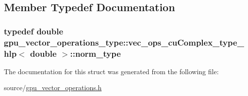 \subsection{Member Typedef Documentation}
\hypertarget{structgpu__vector__operations__type_1_1vec__ops__cuComplex__type__hlp_3_01double_01_4_add361fe5e712d2fc1e3bc5142c49b6d0}{
\subsubsection[{norm\-\_\-type}]{\setlength{\rightskip}{0pt plus 5cm}typedef double {\bf gpu\-\_\-vector\-\_\-operations\-\_\-type\-::vec\-\_\-ops\-\_\-cu\-Complex\-\_\-type\-\_\-hlp}$<$ double $>$\-::{\bf norm\-\_\-type}}}\label{structgpu__vector__operations__type_1_1vec__ops__cuComplex__type__hlp_3_01double_01_4_add361fe5e712d2fc1e3bc5142c49b6d0}


The documentation for this struct was generated from the following file\-:\begin{DoxyCompactItemize}
\item 
source/\hyperlink{gpu__vector__operations_8h}{gpu\-\_\-vector\-\_\-operations.\-h}\end{DoxyCompactItemize}
